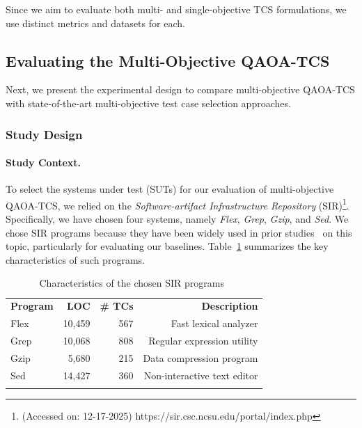 

Since we aim to evaluate both multi- and single-objective TCS formulations, we use distinct metrics and datasets for each.

\subsection{Evaluating the Multi-Objective QAOA-TCS}
Next, we present the experimental design to compare multi-objective QAOA-TCS with state-of-the-art multi-objective test case selection approaches.

\subsubsection{Study Design}
\label{sec:4.2.1}

\paragraph{Study Context.}
To select the systems under test (SUTs) for our evaluation of multi-objective \textsc{QAOA-TCS}, we relied on the \textit{Software-artifact Infrastructure Repository} (SIR)\footnote{(Accessed on: 12-17-2025) https://sir.csc.ncsu.edu/portal/index.php}. Specifically, we have chosen four systems, namely \textit{Flex}, \textit{Grep}, \textit{Gzip}, and \textit{Sed}. We chose SIR programs because they have been widely used in prior studies~\citep{selectqa,yoo2007pareto,panichella2014improving} on this topic, particularly for evaluating our baselines.
Table~\ref{table:sir_programs} summarizes the key characteristics of such programs.

\begin{table}[h]
\footnotesize
\centering
\caption{Characteristics of the chosen SIR programs~\citep{qaoa_tcs}}
\label{table:sir_programs}
\begin{tabular}{@{}lrrr@{}}
\hline\noalign{\smallskip}
\textbf{Program} & \textbf{LOC} & \textbf{\# TCs} & \textbf{Description} \\
\noalign{\smallskip}\hline\noalign{\smallskip}
Flex    & 10,459   & 567  & Fast lexical analyzer  \\
Grep    & 10,068   & 808  & Regular expression utility  \\
Gzip    & 5,680    & 215  & Data compression program  \\
Sed     & 14,427   & 360  & Non-interactive text editor  \\
\noalign{\smallskip}\hline
\end{tabular}
\end{table}

